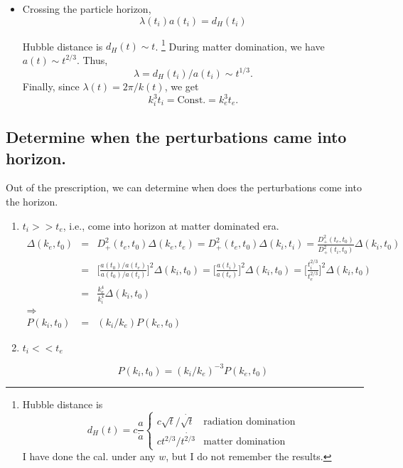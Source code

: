 \begin{itemize}
\item
Crossing the particle horizon,
\begin{equation}
\lambda(t_i)a(t_i)=d_H(t_i)
\end{equation}

Hubble distance is $d_H(t)\sim t$.
\footnote{
Hubble distance is
\begin{equation}
d_H(t)=c\frac{a}{\dot a}
\begin{cases}
c\sqrt{t}/\dot{\sqrt{t}}  & \text{radiation domination} \\
c t^{2/3}/\dot{t^{2/3}} & \text{matter domination}
\end{cases}
\end{equation}
I have done the cal. under any $w$, but I do not remember the results.
} 
During matter domination, we have $a(t)\sim t^{2/3}$.  Thus, \begin{equation}\lambda=d_H(t_i)/a(t_i)\sim t^{1/3}.\end{equation}
Finally, since $\lambda(t)=2\pi /k(t)$, we get
\begin{equation}
k_i^3t_i=\text{Const.}=k_e^3t_e .
\end{equation}


\end{itemize}

\subsection{Determine when the perturbations came into horizon.}
Out of the prescription, we can determine when does the perturbations come into the horizon.

\begin{enumerate}
\item
$t_i>>t_e$, i.e., come into horizon at matter dominated era.
\begin{eqnarray}
\Delta(k_e,t_0)&=&D_+^2(t_e,t_0)\Delta(k_e,t_e)=D_+^2(t_e,t_0)\Delta(k_i,t_i)=\frac{D_+^2(t_e,t_0)}{D_+^2(t_i,t_0)}\Delta(k_i,t_0) \\
&=&\bigg[\frac{a(t_0)/a(t_e)}{a(t_0)/a(t_i)}\bigg]^2\Delta(k_i,t_0)=\bigg[ \frac{a(t_i)}{a(t_e)} \bigg]^2\Delta(k_i,t_0)=\bigg[ \frac{t_i^{2/3}}{t_e^{2/3}} \bigg]^2\Delta(k_i,t_0) \\
&=&\frac{k_e^4}{k_i^4}\Delta(k_i,t_0) \\
\Rightarrow  \nonumber \\ 
P(k_i,t_0)&=&(k_i/k_e)P(k_e,t_0)
\end{eqnarray}



\item
$t_i<<t_e$

\begin{equation}
P(k_i,t_0)=(k_i/k_e)^{-3}P(k_e,t_0)
\end{equation}

\end{enumerate}






